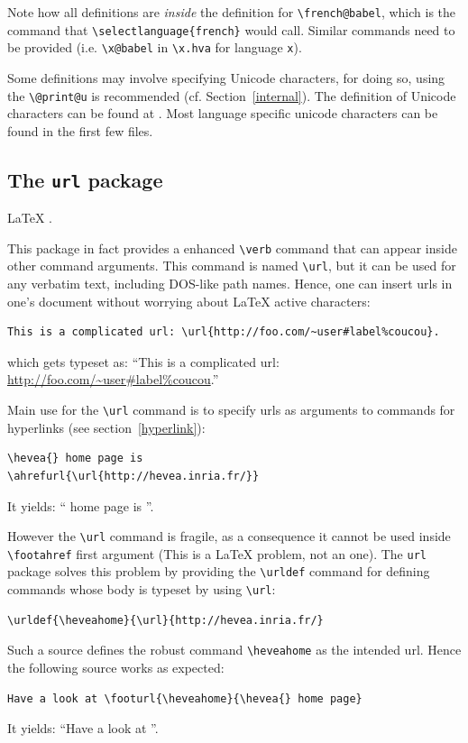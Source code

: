 Note how all definitions are \emph{inside} the definition for \verb+\french@babel+, which is the command that \verb+\selectlanguage{french}+ would call. Similar commands need to be provided (i.e. \verb+\x@babel+ in \verb+\x.hva+ for language \verb+x+).

Some definitions may involve specifying Unicode characters, for doing
so, using the \verb+\@print@u+ is recommended (cf. Section~\ref{internal}).
The definition of Unicode characters can be found at
.
Most language specific unicode characters can be found in the first
few files.

\subsection{The \label{urlpackage}\texttt{url} package}
%
\LaTeX{} .

This package in fact provides a enhanced  \verb+\verb+ command that
can appear inside other command arguments.
This command is named \verb+\url+,
but it can be used for any verbatim text, including DOS-like path
names.
Hence, one can insert urls in one's document without worrying about
\LaTeX{} active characters:
\begin{verbatim}
This is a complicated url: \url{http://foo.com/~user#label%coucou}.
\end{verbatim}
which gets typeset as: ``This is a complicated url: \url{http://foo.com/~user#label%coucou}.''

Main use for the \verb+\url+ command is to specify urls as arguments to
\hevea{} commands for hyperlinks (see section~\ref{hyperlink}):
\begin{verbatim}
\hevea{} home page is
\ahrefurl{\url{http://hevea.inria.fr/}}
\end{verbatim}
It yields: ``\hevea{} home page is
''.

However the \verb+\url+ command is fragile, as a consequence it
cannot be used inside \verb+\footahref+ first argument (This is a
\LaTeX{} problem, not an \hevea{} one).
The \texttt{url} package solves this problem by providing the
\verb+\urldef+ command
for defining commands whose body is typeset by using \verb+\url+:
\begin{verbatim}
\urldef{\heveahome}{\url}{http://hevea.inria.fr/}
\end{verbatim}
%
Such a source defines the robust command \verb+\heveahome+ as the
intended url.
Hence the following source works as expected:
\begin{verbatim}
Have a look at \footurl{\heveahome}{\hevea{} home page}
\end{verbatim}
It yields: ``Have a look at ''.

